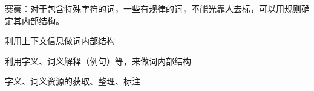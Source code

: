 


赛豪：对于包含特殊字符的词，一些有规律的词，不能光靠人去标，可以用规则确定其内部结构。

利用上下文信息做词内部结构

利用字义、词义解释（例句）等，来做词内部结构

字义、词义资源的获取、整理、标注

